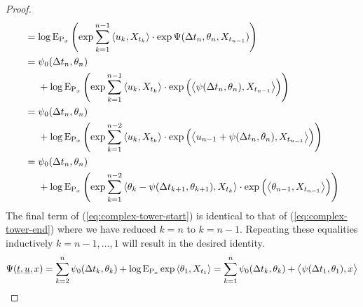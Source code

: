 \begin{proof}
\begin{align}
    \notag
    &= \log{\operatorname{E}}_{{\operatorname{P}}_x}\left( \exp\sum_{k=1}^{n-1} {\langle u_k , X_{t_k} \rangle} \cdot \exp\Psi(\Delta t_n, \theta_n, X_{t_{n-1}})\right) \\
    \notag
    &= \begin{aligned}[t]
      &\psi_0(\Delta t_n, \theta_n) \\
      &+ \log{\operatorname{E}}_{{\operatorname{P}}_x}\left( \exp\sum_{k=1}^{n-1} {\langle u_k , X_{t_k} \rangle} \cdot \exp\Big( {\big\langle \psi(\Delta t_n, \theta_n) , X_{t_{n-1}} \big\rangle} \Big)   \right) 
    \end{aligned} \\
    \notag
    &= \begin{aligned}[t]
      &\psi_0(\Delta t_n, \theta_n) \\
      &+ \log{\operatorname{E}}_{{\operatorname{P}}_x}\left( \exp\sum_{k=1}^{n-2} {\langle u_k , X_{t_k} \rangle} \cdot \exp\Big( {\big\langle u_{n-1} + \psi(\Delta t_n, \theta_n) , X_{t_{n-1}} \big\rangle} \Big)   \right) 
    \end{aligned} \\
    \label{eq:complex-tower-end}
    &= \begin{aligned}[t]
      &\psi_0(\Delta t_n, \theta_n) \\
      &+ \log{\operatorname{E}}_{{\operatorname{P}}_x}\left( \exp\sum_{k=1}^{n-2} {\langle \theta_k - \psi(\Delta t_{k+1}, \theta_{k+1}) , X_{t_k} \rangle} \cdot \exp\Big( {\big\langle \theta_{n-1} , X_{t_{n-1}} \big\rangle} \Big)   \right) 
    \end{aligned}
  \end{align}
  The final term of (\ref{eq:complex-tower-start}) is identical to that of (\ref{eq:complex-tower-end}) where we have reduced $k = n$ to $k = n-1$.
  Repeating these equalities inductively $k = n -1, \ldots, 1$ will result in the desired identity.
  \begin{equation*}
    \Psi(\underline t, \underline{u}, x) 
    = \sum_{k=2}^n \psi_0(\Delta t_k, \theta_k) + \log{\operatorname{E}}_{{\operatorname{P}}_x}\exp{\langle \theta_1 , X_{t_1} \rangle} 
    = \sum_{k=1}^n \psi_0(\Delta t_k, \theta_k) + {\big\langle \psi(\Delta t_1, \theta_1) , x \big\rangle}
  \end{equation*}
\end{proof}
